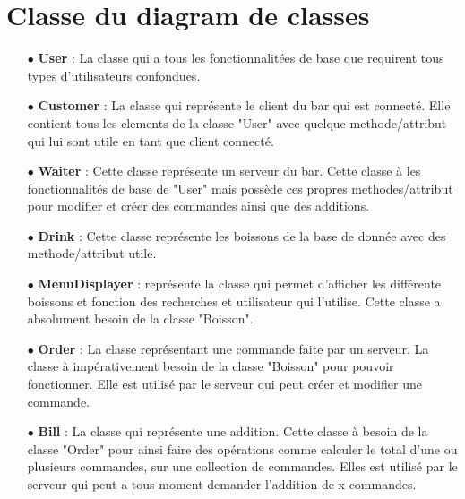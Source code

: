 
	
\section{Classe du diagram de classes}
\begin{itemize}
	\item[{$\bullet$}] \textbf{User} : La classe qui a tous les fonctionnalitées de base que requirent tous types d'utilisateurs confondues.
	\item[{$\bullet$}] \textbf{Customer} : La classe qui représente le client du bar qui est connecté. Elle contient tous les elements de la classe "User" avec quelque methode/attribut qui lui sont utile en tant que client connecté.
	\item[{$\bullet$}] \textbf{Waiter} : Cette classe représente un serveur du bar. Cette classe à les fonctionnalités de base de "User" mais possède ces propres methodes/attribut pour modifier et créer des commandes ainsi que des additions.
	\item[{$\bullet$}] \textbf{Drink} : Cette classe représente les boissons de la base de donnée avec des methode/attribut utile. 
	\item[{$\bullet$}] \textbf{MenuDisplayer} : représente la classe qui permet d'afficher les différente boissons et fonction des recherches et utilisateur qui l'utilise. Cette classe a absolument besoin de la classe "Boisson".
	\item[{$\bullet$}] \textbf{Order} : La classe représentant une commande faite par un serveur. La classe à impérativement besoin de la classe "Boisson" pour pouvoir fonctionner. Elle est utilisé par le serveur qui peut créer et modifier une commande.
	\item[{$\bullet$}] \textbf{Bill} : La classe qui représente une addition. Cette classe à besoin de la classe "Order" pour ainsi faire des opérations comme calculer le total d'une ou plusieurs commandes, sur une collection de commandes. Elles est utilisé par le serveur qui peut a tous moment demander l'addition de x commandes.
\end{itemize}
